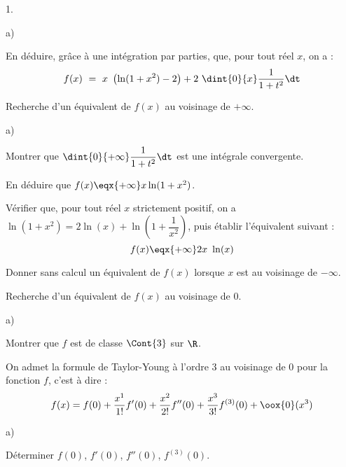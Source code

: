 \documentclass[11pt]{article}%
\begin{document}
\begin{noliste}{1.}
\begin{noliste}{a)}
    

  \item En déduire, grâce à une intégration par parties, que, pour
    tout réel $x$, on a :
    \[
    f(x) \ = \ x \ \left( \ln(1 + x^2) - 2 \right) + 2 \ \dint{0}{x}
    \dfrac{1}{1 + t^2} \dt
    \]
    
  \end{noliste}




\item Recherche d'un équivalent de $f(x)$ au voisinage de $+\infty$.
  \begin{noliste}{a)}
    \setlength{\itemsep}{2mm}
  \item Montrer que $\dint{0}{+\infty} \dfrac{1}{1+t^2} \dt$ est une
    intégrale convergente.

    
    
  \item En déduire que $f(x) \eqx{+\infty} x \ln(1 + x^2)$.

    
    
  \item Vérifier que, pour tout réel $x$ strictement positif, on a
    $\ln(1 + x^2) = 2 \ln(x) + \ln \left( 1 + \dfrac{1}{x^2} \right)$,
    puis établir l'équivalent suivant :
    \[
    f(x) \eqx{+\infty} 2x \ \ln(x)
    \]

    

  \item Donner sans calcul un équivalent de $f(x)$ lorsque $x$ est au
    voisinage de $-\infty$.

    

  \end{noliste}

\item Recherche d'un équivalent de $f(x)$ au voisinage de $0$.
  \begin{noliste}{a)}
    \setlength{\itemsep}{2mm}
  \item Montrer que $f$ est de classe $\Cont{3}$ sur $\R$.

    
  \end{noliste}
  On admet la formule de Taylor-Young à l'ordre $3$ au voisinage de
  $0$ pour la fonction $f$, c'est à dire :
  \[
  f(x) = f(0) + \dfrac{x^1}{1!} f'(0) + \dfrac{x^2}{2!} f''(0) +
  \dfrac{x^3}{3!} f^{(3)}(0) + \oox{0} (x^3)
  \]
  \begin{noliste}{a)}
    \setcounter{enumii}{1} %
    \setlength{\itemsep}{2mm}
  \item Déterminer $f(0)$, $f'(0)$, $f''(0)$, $f^{(3)}(0)$.


\end{noliste}
\end{noliste}
\end{document}
